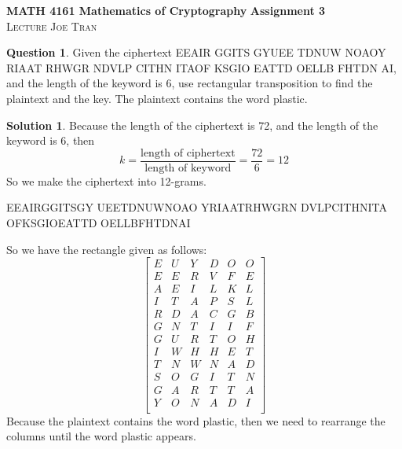 \documentclass[11pt]{amsart}
\date{January 9, 2024}
\theoremstyle{definition}\newtheorem{definition}{Definition}
\theoremstyle{definition}\newtheorem{question}{Question}
\theoremstyle{definition}\newtheorem*{solution}{Solution}
\begin{document}
\noindent \textbf{MATH 4161 Mathematics of Cryptography} \hfill \textbf{Assignment 3} \\
\noindent \textsc{Lecture} \hfill \textsc{Joe Tran}

\begin{question}
    Given the ciphertext \textsf{EEAIR GGITS GYUEE TDNUW NOAOY RIAAT RHWGR NDVLP CITHN ITAOF KSGIO EATTD OELLB FHTDN AI}, and the length of the keyword is 6, use rectangular transposition to find the plaintext and the key. The plaintext contains the word \textsf{plastic}.
\end{question}

\begin{solution}
    Because the length of the ciphertext is 72, and the length of the keyword is 6, then
    \begin{equation*}
        k = \frac{\text{length of ciphertext}}{\text{length of keyword}} = \frac{72}{6} = 12
    \end{equation*}
    So we make the ciphertext into 12-grams.
    \begin{center}
        \textsf{EEAIRGGITSGY UEETDNUWNOAO YRIAATRHWGRN DVLPCITHNITA OFKSGIOEATTD OELLBFHTDNAI}
    \end{center}
    So we have the rectangle given as follows:
    \begin{equation*}
        \begin{bmatrix}
            E & U & Y & D & O & O \\
            E & E & R & V & F & E \\
            A & E & I & L & K & L \\
            I & T & A & P & S & L \\
            R & D & A & C & G & B \\
            G & N & T & I & I & F \\
            G & U & R & T & O & H \\
            I & W & H & H & E & T \\
            T & N & W & N & A & D \\
            S & O & G & I & T & N \\
            G & A & R & T & T & A \\
            Y & O & N & A & D & I \\
        \end{bmatrix}
    \end{equation*}
    Because the plaintext contains the word plastic, then we need to rearrange the columns until the word plastic appears.

\end{solution}
\end{document}
